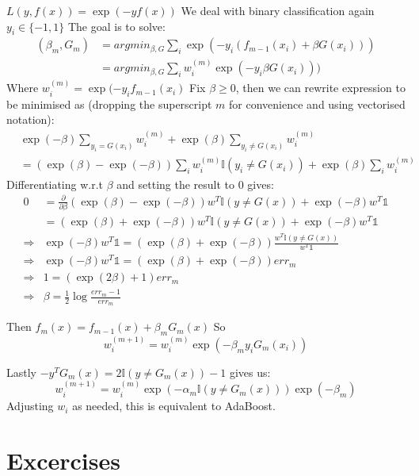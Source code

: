$L(y, f(x)) = \exp(-y f(x))$
We deal with binary classification again $y_i \in \{-1,1\}$
The goal is to solve:
\begin{align*}
    (\beta_m, G_m) &= argmin_{\beta, G} \sum_i \exp(-y_i(f_{m-1}(x_i) + \beta G(x_i))) \\
     &= argmin_{\beta, G} \sum_i w_i^{(m)}\exp(-y_i \beta G(x_i))) 
\end{align*}
Where $w_i^{(m)} =  \exp(-y_i f_{m-1}(x_i)$
Fix $\beta \geq 0$, then we can rewrite expression to be minimised as (dropping the superscript $m$ for convenience and using vectorised notation):
\begin{align*}
    & \exp(-\beta) \sum_{y_i = G(x_i)} w_i^{(m)} + \exp(\beta) \sum_{y_i \neq G(x_i)} w_i^{(m)}\\
    &= \left(\exp(\beta) - \exp(-\beta)\right) \sum_{i} w_i^{(m)}\mathbb{I}\left(y_i \neq G(x_i)\right)+ \exp(\beta) \sum_{i} w_i^{(m)}
\end{align*}
Differentiating w.r.t $\beta$ and setting the result to $0$ gives:
\begin{align*}
   0 &= \frac{\partial }{\partial \beta} \left(\exp(\beta) - \exp(-\beta)\right) w^T\mathbb{I}(y \neq G(x)) + \exp(-\beta) w^T \mathbb{1} \\
   &= \left(\exp(\beta) + \exp(-\beta)\right) w^T\mathbb{I}(y \neq G(x)) + \exp(-\beta) w^T \mathbb{1} \\
    \Rightarrow&  \exp(-\beta) w^T \mathbb{1} = \left(\exp(\beta) + \exp(-\beta)\right) \frac{w^T\mathbb{I}(y \neq G(x))}{ w^T \mathbb{1}} \\
   \Rightarrow&  \exp(-\beta) w^T \mathbb{1}  = \left(\exp(\beta) + \exp(-\beta)\right) err_m \\
   \Rightarrow&  1 =  \left(\exp(2\beta) + 1 \right) err_m \\
   \Rightarrow&   \beta = \frac{1}{2} \log\frac{err_m - 1}{err_m} 
\end{align*}

Then $f_m(x) = f_{m-1}(x) + \beta_m G_m(x)$
So $$w_i^{(m+1)} = w_i^{(m)}  \exp\left(-\beta_m y_i G_m(x_i)\right)$$

Lastly $ -y^T G_m(x) = 2 \mathbb{I}\left(y \neq G_m(x)\right) - 1$ gives us:
$$w_i^{(m+1)} = w_i^{(m)}  \exp\left(-\alpha_m \mathbb{I}\left(y \neq G_m(x)\right) \right)\exp\left(
-\beta_m\right)$$
Adjusting $w_i$ as needed, this is equivalent to AdaBoost.


\section*{Excercises}
